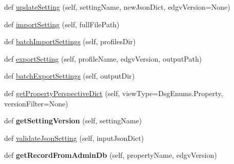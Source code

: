 \begin{DoxyCompactItemize}
\item 
def \mbox{\hyperlink{class_dsg_tools_1_1_server_management_tools_1_1generic_db_manager_1_1_generic_db_manager_a4dcc5a53639b84fdc7f847c2a9e65a77}{update\+Setting}} (self, setting\+Name, new\+Json\+Dict, edgv\+Version=None)
\item 
def \mbox{\hyperlink{class_dsg_tools_1_1_server_management_tools_1_1generic_db_manager_1_1_generic_db_manager_af254decbd6cb86cdcf93e681df9bcb4f}{import\+Setting}} (self, full\+File\+Path)
\item 
def \mbox{\hyperlink{class_dsg_tools_1_1_server_management_tools_1_1generic_db_manager_1_1_generic_db_manager_aa7249fe469bbc7c88dc94c83100d682b}{batch\+Import\+Settings}} (self, profiles\+Dir)
\item 
def \mbox{\hyperlink{class_dsg_tools_1_1_server_management_tools_1_1generic_db_manager_1_1_generic_db_manager_a7f0414ff8fbbea9649608f6093f8fe5a}{export\+Setting}} (self, profile\+Name, edgv\+Version, output\+Path)
\item 
def \mbox{\hyperlink{class_dsg_tools_1_1_server_management_tools_1_1generic_db_manager_1_1_generic_db_manager_a819e748ac71d827bb50ce8cebb322187}{batch\+Export\+Settings}} (self, output\+Dir)
\item 
def \mbox{\hyperlink{class_dsg_tools_1_1_server_management_tools_1_1generic_db_manager_1_1_generic_db_manager_ac8baf4bdec5e9e8ce318b00b59369d13}{get\+Property\+Perspective\+Dict}} (self, view\+Type=Dsg\+Enums.\+Property, version\+Filter=None)
\item 
\mbox{\label{class_dsg_tools_1_1_server_management_tools_1_1generic_db_manager_1_1_generic_db_manager_aebc61a476154dbcb09b9f8ad67546c24}} 
def {\bfseries get\+Setting\+Version} (self, setting\+Name)
\item 
def \mbox{\hyperlink{class_dsg_tools_1_1_server_management_tools_1_1generic_db_manager_1_1_generic_db_manager_ae93ce4976f6b22c9f1b4f5ee7d073514}{validate\+Json\+Setting}} (self, input\+Json\+Dict)
\item 
\mbox{\label{class_dsg_tools_1_1_server_management_tools_1_1generic_db_manager_1_1_generic_db_manager_a1c0fa42fae5a7d7046afb24496177bb8}} 
def {\bfseries get\+Record\+From\+Admin\+Db} (self, property\+Name, edgv\+Version)
\item 

\end{DoxyCompactItemize}
